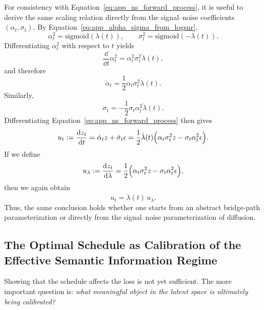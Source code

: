For consistency with Equation~\eqref{eq:app_ns_forward_process}, it is useful to derive the same scaling relation directly from the signal--noise coefficients $(\alpha_t,\sigma_t)$. By Equation~\eqref{eq:app_alpha_sigma_from_logsnr},
\[
\alpha_t^2=\mathrm{sigmoid}(\lambda(t)),
\qquad
\sigma_t^2=\mathrm{sigmoid}(-\lambda(t)).
\]
Differentiating $\alpha_t^2$ with respect to $t$ yields
\begin{equation}
\frac{\dd}{\dd t}\alpha_t^2
=
\alpha_t^2\sigma_t^2\dot\lambda(t),
\label{eq:app_d_alpha_sq}
\end{equation}
and therefore
\begin{equation}
\dot\alpha_t
=
\frac{1}{2}\alpha_t\sigma_t^2\dot\lambda(t).
\label{eq:app_d_alpha}
\end{equation}
Similarly,
\begin{equation}
\dot\sigma_t
=
-\frac{1}{2}\sigma_t\alpha_t^2\dot\lambda(t).
\label{eq:app_d_sigma}
\end{equation}
Differentiating Equation~\eqref{eq:app_ns_forward_process} then gives
\begin{equation}
u_t
:=
\frac{\mathrm{d} z_t}{\mathrm{d} t}
=
\dot\alpha_t z+\dot\sigma_t \epsilon
=
\frac{1}{2}\dot\lambda(t)
\Bigl(
\alpha_t\sigma_t^2 z-\sigma_t\alpha_t^2\epsilon
\Bigr).
\label{eq:app_ut_from_alpha_sigma}
\end{equation}
If we define
\begin{equation}
u_{\lambda}
:=
\frac{\mathrm{d} z_t}{\mathrm{d} \lambda}
=
\frac{1}{2}
\Bigl(
\alpha_t\sigma_t^2 z-\sigma_t\alpha_t^2\epsilon
\Bigr),
\label{eq:app_ulambda_from_alpha_sigma}
\end{equation}
then we again obtain
\begin{equation}
u_t=\dot\lambda(t)\,u_{\lambda}.
\label{eq:app_ut_equals_lambda_dot_ulambda}
\end{equation}
Thus, the same conclusion holds whether one starts from an abstract bridge-path parameterization or directly from the signal--noise parameterization of diffusion.

\subsection{The Optimal Schedule as Calibration of the Effective Semantic Information Regime}
\label{app:optimal_schedule_semantic_calibration}

Showing that the schedule affects the loss is not yet sufficient. The more important question is: \emph{what meaningful object in the latent space is ultimately being calibrated?}

